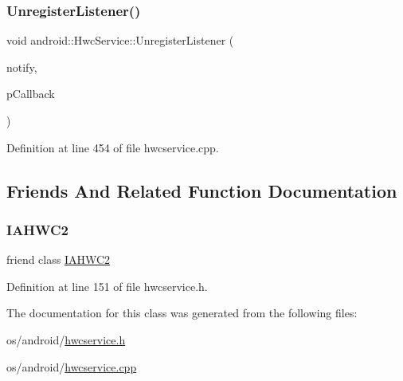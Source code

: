 \subsubsection{\texorpdfstring{Unregister\+Listener()}{UnregisterListener()}}
{\footnotesize\ttfamily void android\+::\+Hwc\+Service\+::\+Unregister\+Listener (\begin{DoxyParamCaption}\item[{\mbox{\hyperlink{classandroid_1_1HwcService_a34049a831dd1c85ef002e59be99d1bd8}{E\+Notification}}}]{notify,  }\item[{\mbox{\hyperlink{classandroid_1_1HwcService_1_1NotifyCallback}{Notify\+Callback}} $\ast$}]{p\+Callback }\end{DoxyParamCaption})}



Definition at line 454 of file hwcservice.\+cpp.


\begin{DoxyCode}{0}
\end{DoxyCode}


\subsection{Friends And Related Function Documentation}
\mbox{\label{classandroid_1_1HwcService_a20f0fd2b9eaf2e89f95db870a0156930}} 
\subsubsection{\texorpdfstring{I\+A\+H\+W\+C2}{IAHWC2}}
{\footnotesize\ttfamily friend class \mbox{\hyperlink{classandroid_1_1IAHWC2}{I\+A\+H\+W\+C2}}\hspace{0.3cm}{\ttfamily [friend]}}



Definition at line 151 of file hwcservice.\+h.



The documentation for this class was generated from the following files\+:\begin{DoxyCompactItemize}
\item 
os/android/\mbox{\hyperlink{hwcservice_8h}{hwcservice.\+h}}\item 
os/android/\mbox{\hyperlink{hwcservice_8cpp}{hwcservice.\+cpp}}\end{DoxyCompactItemize}
